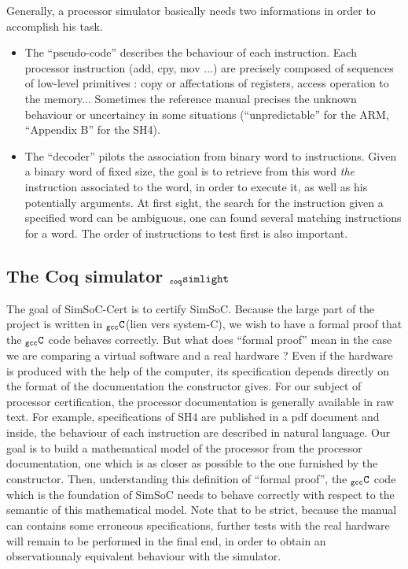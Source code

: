 \documentclass[a4paper, 11pt]{article}
\newcommand{\SL}{$_{\tt coq}{\tt simlight}$\xspace}
\newcommand{\gccC}{$_{\tt gcc}{\tt C}$\xspace}
\begin{document}
Generally, a processor simulator basically needs two informations in order to accomplish his task.
\begin{itemize}
\item The ``pseudo-code'' describes the behaviour of each instruction. Each processor instruction (add, cpy, mov ...) are precisely composed of sequences of low-level primitives : copy or affectations of registers, access operation to the memory... Sometimes the reference manual precises the unknown behaviour or uncertaincy in some situations (``unpredictable'' for the ARM, ``Appendix B'' for the SH4).
\item The ``decoder'' pilots the association from binary word to instructions. Given a binary word of fixed size, the goal is to retrieve from this word \emph{the} instruction associated to the word, in order to execute it, as well as his potentially arguments. At first sight, the search for the instruction given a specified word can be ambiguous, one can found several matching instructions for a word. The order of instructions to test first is also important. %
\end{itemize}

\subsection{The Coq simulator \SL}
The goal of SimSoC-Cert is to certify SimSoC. Because the large part of the project is written in \gccC (lien vers system-C), we wish to have a formal proof that the \gccC code behaves correctly. But what does ``formal proof'' mean in the case we are comparing a virtual software and a real hardware ? Even if the hardware is produced with the help of the computer, its specification depends directly on the format of the documentation the constructor gives. For our subject of processor certification, the processor documentation is generally available in raw text. For example, specifications of SH4 are published in a pdf document and inside, the behaviour of each instruction are described in natural language. Our goal is to build a mathematical model of the processor from the processor documentation, one which is as closer as possible to the one furnished by the constructor. Then, understanding this definition of ``formal proof'', the \gccC code which is the foundation of SimSoC needs to behave correctly with respect to the semantic of this mathematical model. Note that to be strict, because the manual can contains some erroneous specifications, further tests with the real hardware will remain to be performed in the final end, in order to obtain an observationnaly equivalent behaviour with the simulator.
\end{document}
